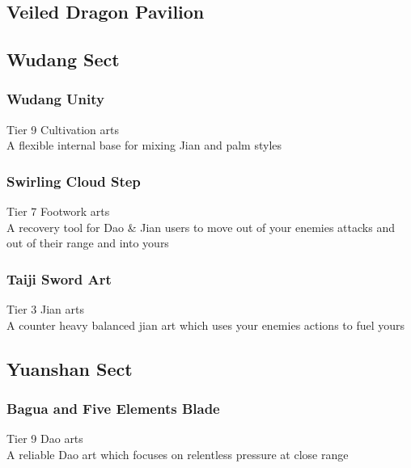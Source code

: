 \subsection{Veiled Dragon Pavilion} %
\subsubsection{}

\subsubsection{}

\subsubsection{}

\subsection{Wudang Sect}
\subsubsection{Wudang Unity}
Tier 9 Cultivation arts\\
A flexible internal base for mixing Jian and palm styles

\subsubsection{Swirling Cloud Step}
Tier 7 Footwork arts \\
A recovery tool for Dao \& Jian users to move out of your enemies attacks and out of their range and into yours

\subsubsection{Taiji Sword Art}
Tier 3 Jian arts\\
A counter heavy balanced jian art which uses your enemies actions to fuel yours

\subsection{Yuanshan Sect}
\subsubsection{Bagua and Five Elements Blade}
Tier 9 Dao arts\\
A reliable Dao art which focuses on relentless pressure at close range

